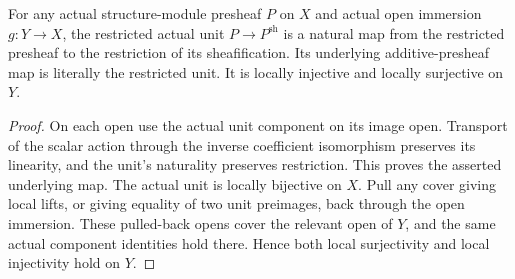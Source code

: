 \begin{lemma}
\label{sc0-canonical-port:geom:open-immersion-restricted-sheafification-unit}
\leanok
For any actual structure-module presheaf \(P\) on \(X\)
and actual open immersion \(g:Y\to X\), the restricted
actual unit \(P\to P^{\mathrm{sh}}\) is a natural map
from the restricted presheaf to the restriction of its
sheafification. Its underlying additive-presheaf map is
literally the restricted unit. It is locally injective
and locally surjective on \(Y\).
\end{lemma}
\begin{proof}
On each open use the actual unit component on its image open.
Transport of the scalar action through the inverse coefficient
isomorphism preserves its linearity, and the unit's naturality
preserves restriction. This proves the asserted underlying map.
The actual unit is locally bijective on \(X\). Pull any
cover giving local lifts, or giving equality of two unit
preimages, back through the open immersion. These pulled-back
opens cover the relevant open of \(Y\), and the same actual
component identities hold there. Hence both local surjectivity
and local injectivity hold on \(Y\).
\end{proof}


